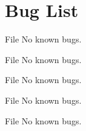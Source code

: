 \chapter{Bug List}
\hypertarget{bug}{}\label{bug}

\begin{DoxyRefList}
\item[File \doxylink{packet__header_8h}{packet\+\_\+header.h} ]\label{bug__bug000001}%
%
No known bugs.  
\item[File \doxylink{receiver_8c}{receiver.c} ]\label{bug__bug000002}%
%
No known bugs.  
\item[File \doxylink{receiver_tcp_8c}{receiver\+Tcp.c} ]\label{bug__bug000003}%
%
No known bugs.  
\item[File \doxylink{sender_8c}{sender.c} ]\label{bug__bug000004}%
%
No known bugs.  
\item[File \doxylink{sender_tcp_8c}{sender\+Tcp.c} ]\label{bug__bug000005}%
%
No known bugs. 
\end{DoxyRefList}